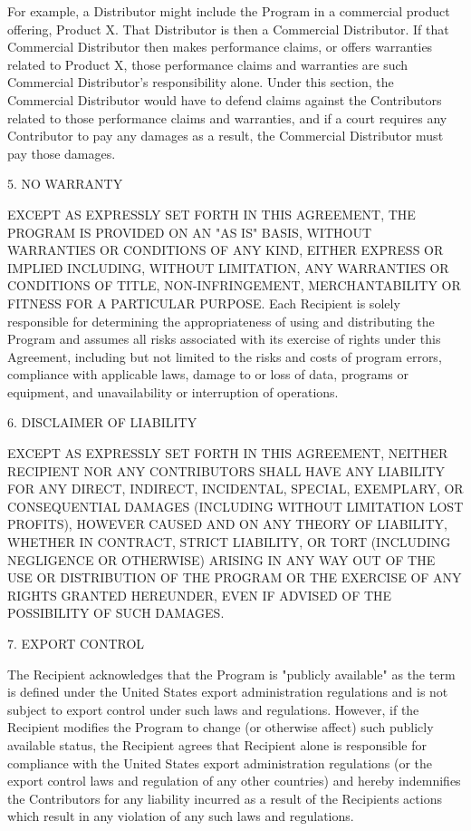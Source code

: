 For example, a Distributor might include the Program in a commercial
product offering, Product X. That Distributor is then a Commercial
Distributor. If that Commercial Distributor then makes performance
claims, or offers warranties related to Product X, those performance
claims and warranties are such Commercial Distributor's responsibility
alone. Under this section, the Commercial Distributor would have to
defend claims against the Contributors related to those performance
claims and warranties, and if a court requires any Contributor to pay
any damages as a result, the Commercial Distributor must pay those
damages. 

5. NO WARRANTY 

EXCEPT AS EXPRESSLY SET FORTH IN THIS AGREEMENT, THE PROGRAM IS
PROVIDED ON AN "AS IS" BASIS, WITHOUT WARRANTIES OR CONDITIONS OF ANY
KIND, EITHER EXPRESS OR IMPLIED INCLUDING, WITHOUT LIMITATION, ANY
WARRANTIES OR CONDITIONS OF TITLE, NON-INFRINGEMENT, MERCHANTABILITY
OR FITNESS FOR A PARTICULAR PURPOSE. Each Recipient is solely
responsible for determining the appropriateness of using and
distributing the Program and assumes all risks associated with its
exercise of rights under this Agreement, including but not limited to
the risks and costs of program errors, compliance with applicable
laws, damage to or loss of data, programs or equipment, and
unavailability or interruption of operations. 

6. DISCLAIMER OF LIABILITY 

EXCEPT AS EXPRESSLY SET FORTH IN THIS AGREEMENT, NEITHER RECIPIENT NOR
ANY CONTRIBUTORS SHALL HAVE ANY LIABILITY FOR ANY DIRECT, INDIRECT,
INCIDENTAL, SPECIAL, EXEMPLARY, OR CONSEQUENTIAL DAMAGES (INCLUDING
WITHOUT LIMITATION LOST PROFITS), HOWEVER CAUSED AND ON ANY THEORY OF
LIABILITY, WHETHER IN CONTRACT, STRICT LIABILITY, OR TORT (INCLUDING
NEGLIGENCE OR OTHERWISE) ARISING IN ANY WAY OUT OF THE USE OR
DISTRIBUTION OF THE PROGRAM OR THE EXERCISE OF ANY RIGHTS GRANTED
HEREUNDER, EVEN IF ADVISED OF THE POSSIBILITY OF SUCH DAMAGES. 


7. EXPORT CONTROL 

The Recipient acknowledges that the Program is "publicly available" as
the term is defined under the United States export administration
regulations and is not subject to export control under such laws and
regulations. However, if the Recipient modifies the Program to change
(or otherwise affect) such publicly available status, the Recipient
agrees that Recipient alone is responsible for compliance with the
United States export administration regulations (or the export control
laws and regulation of any other countries) and hereby indemnifies the
Contributors for any liability incurred as a result of the Recipients
actions which result in any violation of any such laws and
regulations. 

